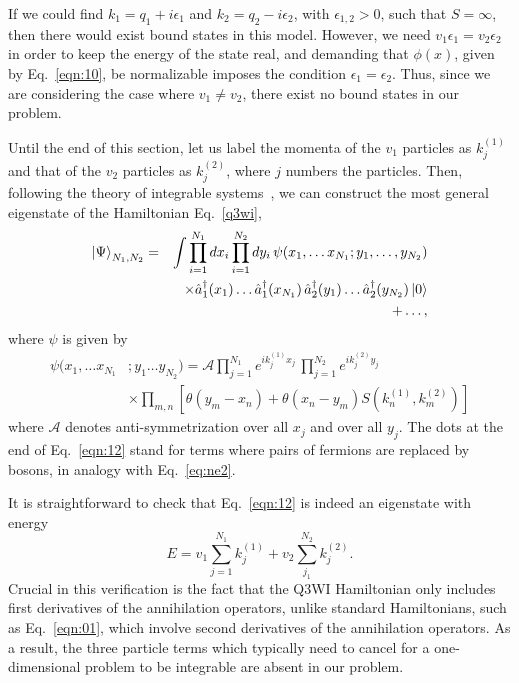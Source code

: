 \documentclass[aps,pra,
superscriptaddress,
reprint,twocolumn,preprintnumbers,
amsmath,amssymb,
nofootinbib]{revtex4-1}
\begin{document}
If we could find $k_1 = q_1 + i\epsilon_1$ and $k_2 = q_2 - i\epsilon_2$, with $\epsilon_{1,2}>0$, such that $S = \infty$, then there would exist bound states in this model. However, we need $v_1 \epsilon_1 = v_2 \epsilon_2$ in order to keep the energy of the state real, and demanding that $\phi(x)$, given by Eq.~\eqref{eqn:10}, be normalizable imposes the condition $\epsilon_1 = \epsilon_2$. Thus, since we are considering the case where $v_1 \neq v_2$, 
there exist no bound states in our problem.

Until the end of this section, let us label the momenta of the $v_1$ particles as $k^{(1)}_j$ and that of the $v_2$ particles as $k^{(2)}_j$, where $j$ numbers the particles. Then, following the theory of integrable systems~\cite{Korepin1993}, we can construct the most general eigenstate of the Hamiltonian Eq.~\eqref{q3wi},
\begin{eqnarray}  \label{eqn:12}
\left| \Psi \right>_{N_1, N_2} & = &  \int \prod_{i=1}^{N_1} dx_i  \prod_{i=1}^{N_2} dy_i \, \psi(x_1, \dots x_{N_1}; y_1, \dots, y_{N_2}) \cr && \times
\hat a^\dagger_1(x_1) \dots \hat a^\dagger_1(x_{N_1}) \, \hat a^\dagger_2(y_1) \dots \hat a^\dagger_2 (y_{N_2}) \left|0 \right> \cr && + \dots,
\end{eqnarray} where $\psi$ is given by
		\begin{align}
		\psi(x_1,\dots x_{N_1}&;y_1\dots y_{N_2})=\mathcal{A}\prod_{j=1}^{N_1}e^{i k^{(1)}_j x_j}\,\prod_{j=1}^{N_2}e^{i k^{(2)}_j y_j} \nonumber \\
		&\times \prod_{m,n} \left[\theta(y_m - x_n) + \theta(x_n - y_m) S(k^{(1)}_n,k^{(2)}_m) \right]
		\end{align}
where $\mathcal{A}$ denotes anti-symmetrization over all $x_j$ and over all $y_j$. The dots at the end of Eq.~\eqref{eqn:12} stand for terms where pairs of fermions are replaced by bosons, in analogy with Eq.~\eqref{eq:ne2}.

It is straightforward to check that Eq.~\eqref{eqn:12} is indeed an eigenstate with energy
        \begin{equation}
        E = v_1 \sum_{j = 1}^{N_1} k^{(1)}_j + v_2 \sum_{j_1}^{N_2} k^{(2)}_j .
        \end{equation}
Crucial in this verification is the fact that the Q3WI Hamiltonian only includes first derivatives of the annihilation operators, unlike standard Hamiltonians, such as Eq.~\eqref{eqn:01}, which
involve second derivatives of the annihilation operators. As a result, the three particle terms which typically need to cancel for a one-dimensional problem to be integrable are absent in our problem.
        
\end{document}
